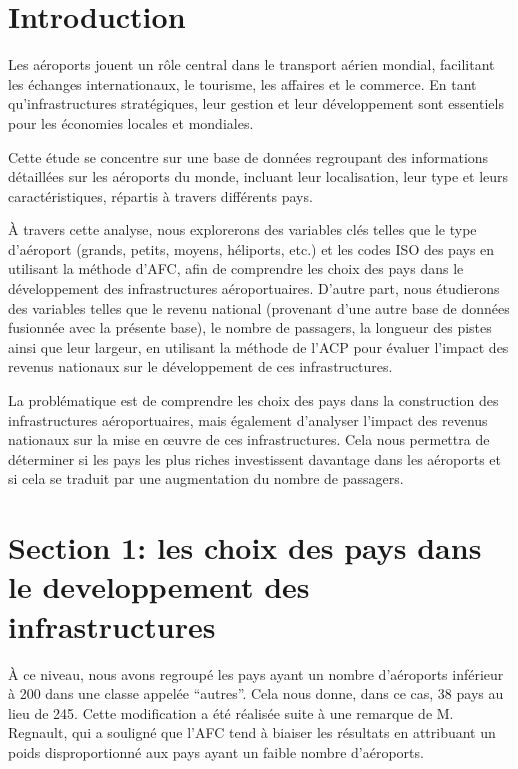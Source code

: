 \documentclass[
]{compterendu}
\begin{document}
\section{\texorpdfstring{\textbf{Introduction}}{Introduction}}\label{introduction}

Les aéroports jouent un rôle central dans le transport aérien mondial,
facilitant les échanges internationaux, le tourisme, les affaires et le
commerce. En tant qu'infrastructures stratégiques, leur gestion et leur
développement sont essentiels pour les économies locales et mondiales.

Cette étude se concentre sur une base de données regroupant des
informations détaillées sur les aéroports du monde, incluant leur
localisation, leur type et leurs caractéristiques, répartis à travers
différents pays.

À travers cette analyse, nous explorerons des variables clés telles que
le type d'aéroport (grands, petits, moyens, héliports, etc.) et les
codes ISO des pays en utilisant la méthode d'AFC, afin de comprendre les
choix des pays dans le développement des infrastructures aéroportuaires.
D'autre part, nous étudierons des variables telles que le revenu
national (provenant d'une autre base de données fusionnée avec la
présente base), le nombre de passagers, la longueur des pistes ainsi que
leur largeur, en utilisant la méthode de l'ACP pour évaluer l'impact des
revenus nationaux sur le développement de ces infrastructures.

La problématique est de comprendre les choix des pays dans la
construction des infrastructures aéroportuaires, mais également
d'analyser l'impact des revenus nationaux sur la mise en œuvre de ces
infrastructures. Cela nous permettra de déterminer si les pays les plus
riches investissent davantage dans les aéroports et si cela se traduit
par une augmentation du nombre de passagers.

\section{\texorpdfstring{\textbf{Section 1: les choix des pays dans le
developpement des
infrastructures}}{Section 1: les choix des pays dans le developpement des infrastructures}}\label{section-1-les-choix-des-pays-dans-le-developpement-des-infrastructures}

À ce niveau, nous avons regroupé les pays ayant un nombre d'aéroports
inférieur à 200 dans une classe appelée ``autres''. Cela nous donne,
dans ce cas, 38 pays au lieu de 245. Cette modification a été réalisée
suite à une remarque de M. Regnault, qui a souligné que l'AFC tend à
biaiser les résultats en attribuant un poids disproportionné aux pays
ayant un faible nombre d'aéroports.
\end{document}
